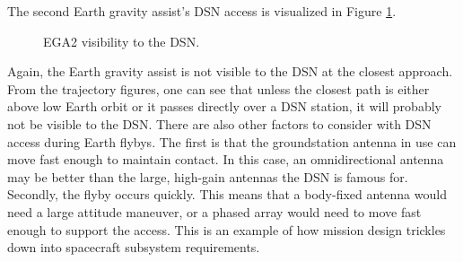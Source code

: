 \documentclass[]{aiaa-tc}%
\begin{document}
The second Earth gravity assist's DSN access is visualized in Figure \ref{fig:EGA2_Access}.
	\begin{figure}[H]
		\centering
		\caption{EGA2 visibility to the DSN. }
		\label{fig:EGA2_Access}
	\end{figure}	

Again, the Earth gravity assist is not visible to the DSN at the closest approach. From the trajectory figures, one can see that unless the closest path is either above low Earth orbit or it passes directly over a DSN station, it will probably not be visible to the DSN. There are also other factors to consider with DSN access during Earth flybys. The first is that the groundstation antenna in use can move fast enough to maintain contact. In this case, an omnidirectional antenna may be better than the large, high-gain antennas the DSN is famous for. Secondly, the flyby occurs quickly. This means that a body-fixed antenna would need a large attitude maneuver, or a phased array would need to move fast enough to support the access. This is an example of how mission design trickles down into spacecraft subsystem requirements.

	\vspace{5 mm}
\end{document}
